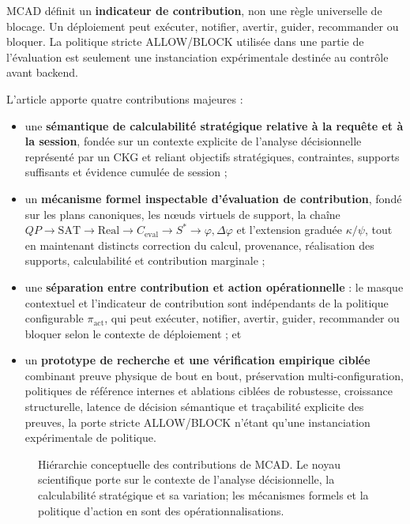 \documentclass[journal]{IEEEtran}
\begin{document}
MCAD définit un \textbf{indicateur de contribution}, non une règle universelle de blocage. Un déploiement peut exécuter, notifier, avertir, guider, recommander ou bloquer. La politique stricte ALLOW/BLOCK utilisée dans une partie de l'évaluation est seulement une instanciation expérimentale destinée au contrôle avant backend.

L'article apporte quatre contributions majeures :
\begin{itemize}
  \item une \textbf{sémantique de calculabilité stratégique relative à la requête et à la session}, fondée sur un contexte explicite de l'analyse décisionnelle représenté par un CKG et reliant objectifs stratégiques, contraintes, supports suffisants et évidence cumulée de session ;
  \item un \textbf{mécanisme formel inspectable d'évaluation de contribution}, fondé sur les plans canoniques, les nœuds virtuels de support, la chaîne $QP\rightarrow\mathrm{SAT}\rightarrow\mathrm{Real}\rightarrow C_{\mathrm{eval}}\rightarrow S^*\rightarrow\varphi,\Delta\varphi$ et l'extension graduée $\kappa/\psi$, tout en maintenant distincts correction du calcul, provenance, réalisation des supports, calculabilité et contribution marginale ;
  \item une \textbf{séparation entre contribution et action opérationnelle} : le masque contextuel et l'indicateur de contribution sont indépendants de la politique configurable $\pi_{\mathrm{act}}$, qui peut exécuter, notifier, avertir, guider, recommander ou bloquer selon le contexte de déploiement ; et
  \item un \textbf{prototype de recherche et une vérification empirique ciblée} combinant preuve physique de bout en bout, préservation multi-configuration, politiques de référence internes et ablations ciblées de robustesse, croissance structurelle, latence de décision sémantique et traçabilité explicite des preuves, la porte stricte ALLOW/BLOCK n'étant qu'une instanciation expérimentale de politique.
\end{itemize}

\begin{figure}[!t]
\centering
\resizebox{0.95\textwidth}{!}{}
\caption{Hiérarchie conceptuelle des contributions de MCAD. Le noyau scientifique porte sur le contexte de l'analyse décisionnelle, la calculabilité stratégique et sa variation; les mécanismes formels et la politique d'action en sont des opérationnalisations.}
\label{fig:contribution-hierarchy}
\end{figure}
\end{document}
